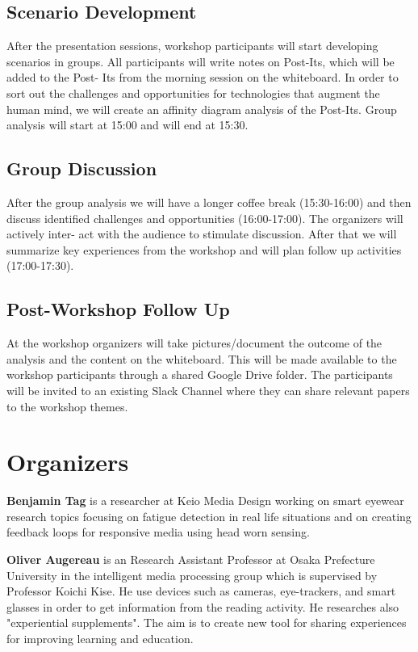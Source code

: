\documentclass{sigchi-ext}
\begin{document}
\subsection{Scenario Development}
After the presentation sessions, workshop participants will start developing scenarios in groups. All participants will write notes on Post-Its, which will be added to the Post- Its from the morning session on the whiteboard. In order to sort out the challenges and opportunities for technologies that augment the human mind, we will create an affinity diagram analysis of the Post-Its. Group analysis will start at 15:00 and will end at 15:30.

\subsection{Group Discussion}
After the group analysis we will have a longer coffee break (15:30-16:00) and then discuss identified challenges and opportunities (16:00-17:00). The organizers will actively inter- act with the audience to stimulate discussion. After that we will summarize key experiences from the workshop and will plan follow up activities (17:00-17:30).

\subsection{Post-Workshop Follow Up}
At the workshop organizers will take pictures/document the outcome of the analysis and the content on the whiteboard. This will be made available to the workshop participants through a shared Google Drive folder. The participants will be invited to an existing Slack Channel where they can share relevant papers to the workshop themes.

\section{Organizers}

{\bf Benjamin Tag} is a researcher at Keio Media Design working on smart eyewear research topics focusing on fatigue detection in real life situations and on creating feedback loops for responsive media using head worn sensing.

{\bf Oliver Augereau} is an Research Assistant Professor at Osaka Prefecture University in the intelligent media processing group which is supervised by Professor Koichi Kise. He use devices such as cameras, eye-trackers, and smart glasses in order to get information from the reading activity. He researches also "experiential supplements". The aim is to create new tool for sharing experiences for improving learning and education.
\end{document}
